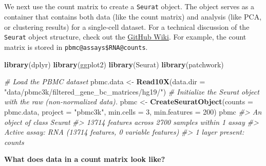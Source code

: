 \documentclass[
]{book}
\newenvironment{Shaded}{\begin{snugshade}}{\end{snugshade}}
\newcommand{\AttributeTok}[1]{\textcolor[rgb]{0.13,0.29,0.53}{#1}}
\newcommand{\CommentTok}[1]{\textcolor[rgb]{0.56,0.35,0.01}{\textit{#1}}}
\newcommand{\DecValTok}[1]{\textcolor[rgb]{0.00,0.00,0.81}{#1}}
\newcommand{\FunctionTok}[1]{\textcolor[rgb]{0.13,0.29,0.53}{\textbf{#1}}}
\newcommand{\NormalTok}[1]{#1}
\newcommand{\OtherTok}[1]{\textcolor[rgb]{0.56,0.35,0.01}{#1}}
\newcommand{\StringTok}[1]{\textcolor[rgb]{0.31,0.60,0.02}{#1}}
\begin{document}
\subsection*{}\label{section}

We next use the count matrix to create a \texttt{Seurat} object. The object serves as a container that contains both data (like the count matrix) and analysis (like PCA, or clustering results) for a single-cell dataset. For a technical discussion of the \texttt{Seurat} object structure, check out the \href{https://github.com/satijalab/seurat/wiki}{GitHub Wiki}. For example, the count matrix is stored in \texttt{pbmc@assays\$RNA@counts}.

\begin{Shaded}
\begin{Highlighting}[]
\FunctionTok{library}\NormalTok{(dplyr)}
\FunctionTok{library}\NormalTok{(ggplot2)}
\FunctionTok{library}\NormalTok{(Seurat)}
\FunctionTok{library}\NormalTok{(patchwork)}
\end{Highlighting}
\end{Shaded}

\begin{Shaded}
\begin{Highlighting}[]
\CommentTok{\# Load the PBMC dataset}
\NormalTok{pbmc.data }\OtherTok{\textless{}{-}} \FunctionTok{Read10X}\NormalTok{(}\AttributeTok{data.dir =} \StringTok{"data/pbmc3k/filtered\_gene\_bc\_matrices/hg19/"}\NormalTok{)}
\CommentTok{\# Initialize the Seurat object with the raw (non{-}normalized data).}
\NormalTok{pbmc }\OtherTok{\textless{}{-}} \FunctionTok{CreateSeuratObject}\NormalTok{(}\AttributeTok{counts =}\NormalTok{ pbmc.data, }\AttributeTok{project =} \StringTok{"pbmc3k"}\NormalTok{, }\AttributeTok{min.cells =} \DecValTok{3}\NormalTok{, }\AttributeTok{min.features =} \DecValTok{200}\NormalTok{)}
\NormalTok{pbmc}
\CommentTok{\#\textgreater{} An object of class Seurat }
\CommentTok{\#\textgreater{} 13714 features across 2700 samples within 1 assay }
\CommentTok{\#\textgreater{} Active assay: RNA (13714 features, 0 variable features)}
\CommentTok{\#\textgreater{}  1 layer present: counts}
\end{Highlighting}
\end{Shaded}

\textbf{What does data in a count matrix look like?}
\end{document}

